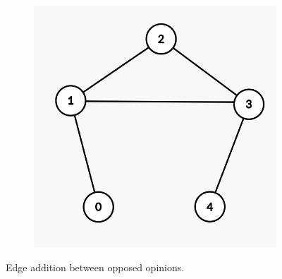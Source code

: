 \begin{figure}[h]
\begin{subfigure}[t]{0.3\textwidth}
		\includegraphics[height=0.15\textheight]{Figures/p5B}
		\caption{}
		\label{subfig:monotonicityB}
	\end{subfigure}
	\vspace{20pt}
	\hfill
	\caption{Edge addition between opposed opinions.}
	\label{fig:p5}
\end{figure}

